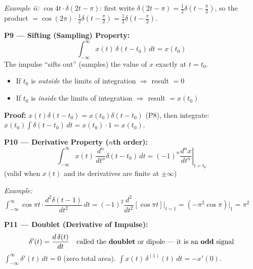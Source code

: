 \documentclass[10pt,a4paper]{article}
\newcommand{\Int}{\displaystyle\int_{-\infty}^{\infty}}
\begin{document}
\begin{propbox}
\quad\textit{Example ii:} $\cos4t\cdot\delta(2t-\pi)$: first write $\delta(2t-\pi)=\tfrac{1}{2}\delta(t-\tfrac{\pi}{2})$, so the product $= \cos(2\pi)\cdot\tfrac{1}{2}\delta(t-\tfrac{\pi}{2}) = \tfrac{1}{2}\delta(t-\tfrac{\pi}{2})$.

\medskip
\textbf{P9 --- Sifting (Sampling) Property:}
\[
  \Int x(t)\,\delta(t - t_0)\,dt = x(t_0)
\]
The impulse ``sifts out'' (samples) the value of $x$ exactly at $t = t_0$.
\begin{itemize}
  \item If $t_0$ is \emph{outside} the limits of integration $\Rightarrow$ result $= 0$
  \item If $t_0$ is \emph{inside} the limits of integration $\Rightarrow$ result $= x(t_0)$
\end{itemize}
\textbf{Proof:} $x(t)\delta(t-t_0) = x(t_0)\delta(t-t_0)$ (P8), then integrate: $x(t_0)\int\delta(t-t_0)\,dt = x(t_0)\cdot 1 = x(t_0)$.

\medskip
\textbf{P10 --- Derivative Property ($n$th order):}
\[
  \Int x(t)\,\frac{d^n}{dt^n}\delta(t - t_0)\,dt = (-1)^n \left.\frac{d^n x}{dt^n}\right|_{t=t_0}
\]
(valid when $x(t)$ and its derivatives are finite at $\pm\infty$)

\quad\textit{Example:} $\Int \cos\pi t \cdot \dfrac{d^2\delta(t-1)}{dt^2}\,dt = (-1)^2 \dfrac{d^2}{dt^2}[\cos\pi t]\Big|_{t=1} = (-\pi^2\cos\pi)\big|_1 = \pi^2$

\medskip
\textbf{P11 --- Doublet (Derivative of Impulse):}
\[
  \delta'(t) = \frac{d\,\delta(t)}{dt} \quad \text{called the \textbf{doublet} or dipole --- it is an \textbf{odd} signal}
\]
$\Int \delta'(t)\,dt = 0$ (zero total area). \quad $\int x(t)\,\delta^{(1)}(t)\,dt = -x'(0)$.

\begin{center}
\end{center}
\end{propbox}
\end{document}
